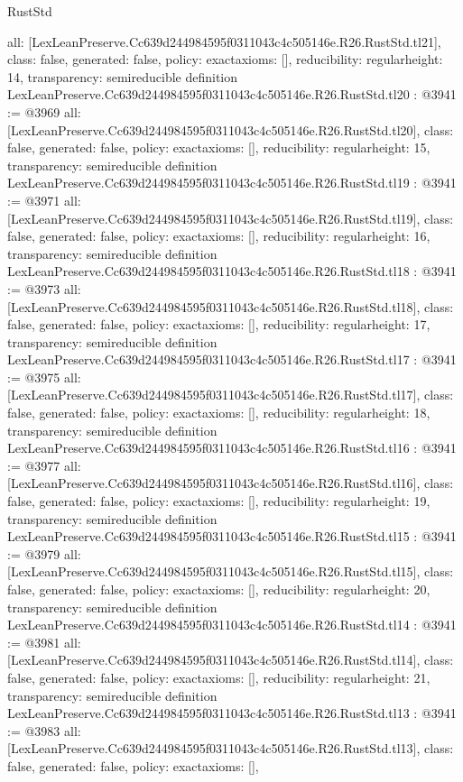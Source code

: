 \begin{lexlean}{RustStd}
\begin{coremodule}
{  all: [LexLeanPreserve.Cc639d244984595f0311043c4c505146e.R26.RustStd.tl21],
  class: false,
  generated: false,
  policy: exact{axioms: []},
  reducibility: regular{height: 14},
  transparency: semireducible
}
definition LexLeanPreserve.Cc639d244984595f0311043c4c505146e.R26.RustStd.tl20 : @3941 := @3969 {
  all: [LexLeanPreserve.Cc639d244984595f0311043c4c505146e.R26.RustStd.tl20],
  class: false,
  generated: false,
  policy: exact{axioms: []},
  reducibility: regular{height: 15},
  transparency: semireducible
}
definition LexLeanPreserve.Cc639d244984595f0311043c4c505146e.R26.RustStd.tl19 : @3941 := @3971 {
  all: [LexLeanPreserve.Cc639d244984595f0311043c4c505146e.R26.RustStd.tl19],
  class: false,
  generated: false,
  policy: exact{axioms: []},
  reducibility: regular{height: 16},
  transparency: semireducible
}
definition LexLeanPreserve.Cc639d244984595f0311043c4c505146e.R26.RustStd.tl18 : @3941 := @3973 {
  all: [LexLeanPreserve.Cc639d244984595f0311043c4c505146e.R26.RustStd.tl18],
  class: false,
  generated: false,
  policy: exact{axioms: []},
  reducibility: regular{height: 17},
  transparency: semireducible
}
definition LexLeanPreserve.Cc639d244984595f0311043c4c505146e.R26.RustStd.tl17 : @3941 := @3975 {
  all: [LexLeanPreserve.Cc639d244984595f0311043c4c505146e.R26.RustStd.tl17],
  class: false,
  generated: false,
  policy: exact{axioms: []},
  reducibility: regular{height: 18},
  transparency: semireducible
}
definition LexLeanPreserve.Cc639d244984595f0311043c4c505146e.R26.RustStd.tl16 : @3941 := @3977 {
  all: [LexLeanPreserve.Cc639d244984595f0311043c4c505146e.R26.RustStd.tl16],
  class: false,
  generated: false,
  policy: exact{axioms: []},
  reducibility: regular{height: 19},
  transparency: semireducible
}
definition LexLeanPreserve.Cc639d244984595f0311043c4c505146e.R26.RustStd.tl15 : @3941 := @3979 {
  all: [LexLeanPreserve.Cc639d244984595f0311043c4c505146e.R26.RustStd.tl15],
  class: false,
  generated: false,
  policy: exact{axioms: []},
  reducibility: regular{height: 20},
  transparency: semireducible
}
definition LexLeanPreserve.Cc639d244984595f0311043c4c505146e.R26.RustStd.tl14 : @3941 := @3981 {
  all: [LexLeanPreserve.Cc639d244984595f0311043c4c505146e.R26.RustStd.tl14],
  class: false,
  generated: false,
  policy: exact{axioms: []},
  reducibility: regular{height: 21},
  transparency: semireducible
}
definition LexLeanPreserve.Cc639d244984595f0311043c4c505146e.R26.RustStd.tl13 : @3941 := @3983 {
  all: [LexLeanPreserve.Cc639d244984595f0311043c4c505146e.R26.RustStd.tl13],
  class: false,
  generated: false,
  policy: exact{axioms: []},
}
\end{coremodule}
\end{lexlean}

